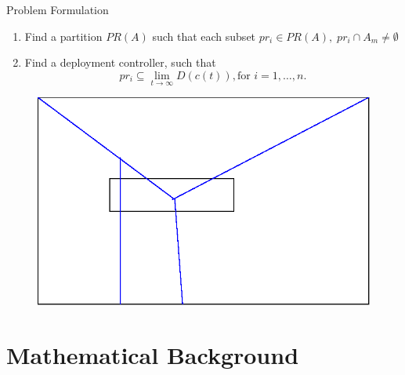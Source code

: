 \documentclass[t]{beamer}
\begin{document}
\begin{frame}[label=probformulation2]{Problem Formulation}
\begin{problem} \label{GeneralProblem}
\begin{enumerate}
\item Find a partition $PR(A)$ such that each subset $pr_i \in PR(A), \; pr_i \cap A_m \neq \emptyset$
\item Find a deployment controller, such that $$ pr_i \subseteq \lim_{t\rightarrow \infty}D(c(t)),\text{for }i=1,\ldots,n.$$
\end{enumerate}
\end{problem}
\pause
\begin{figure}[b]
\includegraphics[scale=0.5]{background/problem-formulation-example.eps}
\end{figure}
\end{frame}


\section[Mathematical Background]{Mathematical Background}
\end{document}
